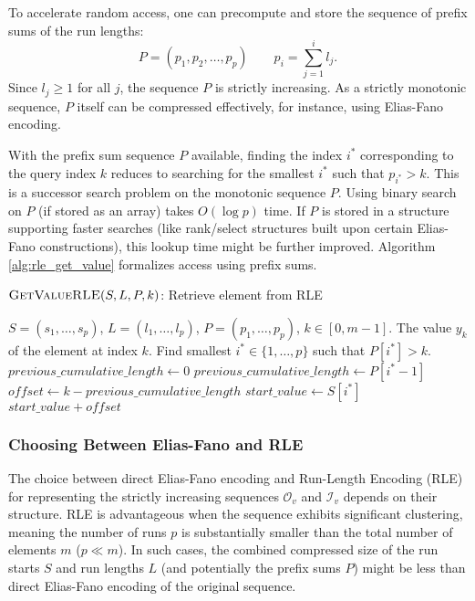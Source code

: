 To accelerate random access, one can precompute and store the sequence of prefix sums of the run lengths:
\[ P = (p_1, p_2, \dots, p_p) \qquad  p_i = \sum_{j=1}^{i} l_j. \]
Since $l_j \ge 1$ for all $j$, the sequence $P$ is strictly increasing. As a strictly monotonic sequence, $P$ itself can be compressed effectively, for instance, using Elias-Fano encoding.

With the prefix sum sequence $P$ available, finding the index $i^*$ corresponding to the query index $k$ reduces to searching for the smallest $i^*$ such that $p_{i^*} > k$. This is a successor search problem on the monotonic sequence $P$. Using binary search on $P$ (if stored as an array) takes $O(\log p)$ time. If $P$ is stored in a structure supporting faster searches (like rank/select structures built upon certain Elias-Fano constructions), this lookup time might be further improved. Algorithm \ref{alg:rle_get_value} formalizes access using prefix sums.

\begin{algorithm}[htbp]
    \caption{$\textsc{GetValueRLE}(S, L, P, k)$: Retrieve element from RLE} %
    \label{alg:rle_get_value}
    \small
    \begin{algorithmic}[1]
        \Require $S=(s_1,\dots,s_p)$, $L=(l_1,\dots,l_p)$, $P=(p_1, \dots, p_p)$, $k \in [0, m-1]$.
        \Ensure The value $y_k$ of the element at index $k$.
        \State Find smallest $i^* \in \{1, \dots, p\}$ such that $P[i^*] > k$.
        \State $previous\_cumulative\_length \leftarrow 0$
        \Else
        \State $previous\_cumulative\_length \leftarrow P[i^*-1]$
        \EndIf
        \State $offset \leftarrow k - previous\_cumulative\_length$
        \State $start\_value \leftarrow S[i^*]$
        \State \Return $start\_value + offset$
    \end{algorithmic}
\end{algorithm}

\subsubsection*{Choosing Between Elias-Fano and RLE}
The choice between direct Elias-Fano encoding and Run-Length Encoding (RLE) for representing the strictly increasing sequences $\mathcal{O}_v$ and $\mathcal{I}_v$ depends on their structure. RLE is advantageous when the sequence exhibits significant clustering, meaning the number of runs $p$ is substantially smaller than the total number of elements $m$ ($p \ll m$). In such cases, the combined compressed size of the run starts $S$ and run lengths $L$ (and potentially the prefix sums $P$) might be less than direct Elias-Fano encoding of the original sequence.

